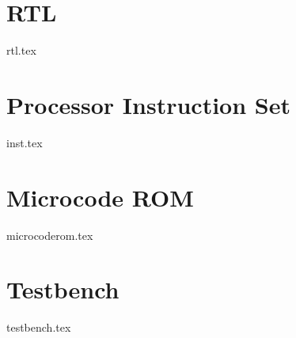 \documentclass[letterpaper,11pt]{report}
\begin{document}
	\chapter{RTL}
	{rtl.tex}
	\begin{appendices}
		\chapter{Processor Instruction Set}\label{app:proc_iset}
		{inst.tex}
		\chapter{Microcode ROM}\label{app:mcrom}
		{microcoderom.tex}
		\chapter{Testbench}\label{app:testbench}
		{testbench.tex}
	\end{appendices}
\end{document}
